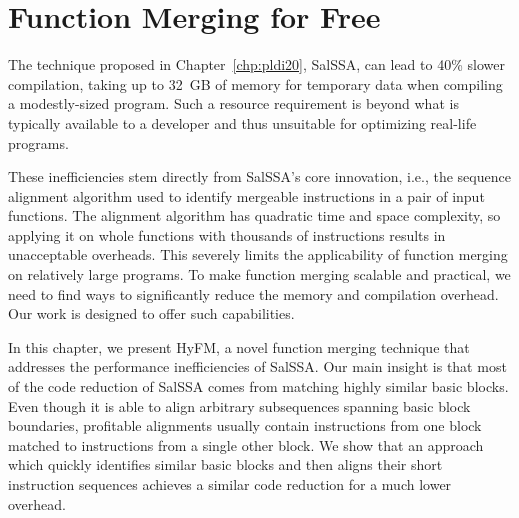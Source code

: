
\chapter{Function Merging for Free} \label{chp:lctes21}


\renewcommand{\ProjName}{{HyFM}\xspace}
\newcommand{\SOAName}{{SalSSA}\xspace}
\newcommand{\NW}{{Needleman-Wunsch}\xspace}


The technique proposed in Chapter~\ref{chp:pldi20}, {\SOAName}, can lead to 40\% slower compilation, taking up to 32~GB of memory for temporary data when compiling a modestly-sized program.
Such a resource requirement is beyond what is typically available to a developer and thus unsuitable for optimizing real-life programs.

These inefficiencies stem directly from {\SOAName}'s core innovation, i.e., the sequence alignment algorithm used to identify mergeable instructions in a pair of input functions.
The alignment algorithm has quadratic time and space complexity, so applying it on whole functions with thousands of instructions results in unacceptable overheads.
This severely limits the applicability of function merging on relatively large programs.
To make function merging scalable and practical, we need to find ways to significantly reduce the memory and compilation overhead. Our work is designed to offer such capabilities.   


In this chapter, we present \ProjName, a novel function merging technique that addresses the performance inefficiencies of \SOAName.
Our main insight is that most of the code reduction of {\SOAName} comes from matching highly similar basic blocks.
Even though it is able to align arbitrary subsequences spanning basic block boundaries, profitable alignments usually contain instructions from one block matched to instructions from a single other block.
We show that an approach which quickly identifies similar basic blocks and then aligns their short instruction sequences achieves a similar code reduction for a much lower overhead.

